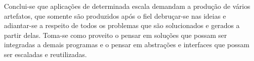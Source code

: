 \documentclass[12pt]{article}
\begin{document}
Conclui-se que aplicações de determinada escala demandam a produção de vários artefatos, que somente são produzidos após o fiel debruçar-se nas ideias e adiantar-se a respeito de todos os problemas que são solucionados e gerados a partir delas. Toma-se como proveito o pensar em soluções que possam ser integradas a demais programas e o pensar em abstrações e interfaces que possam ser escaladas e reutilizadas.
\end{document}
